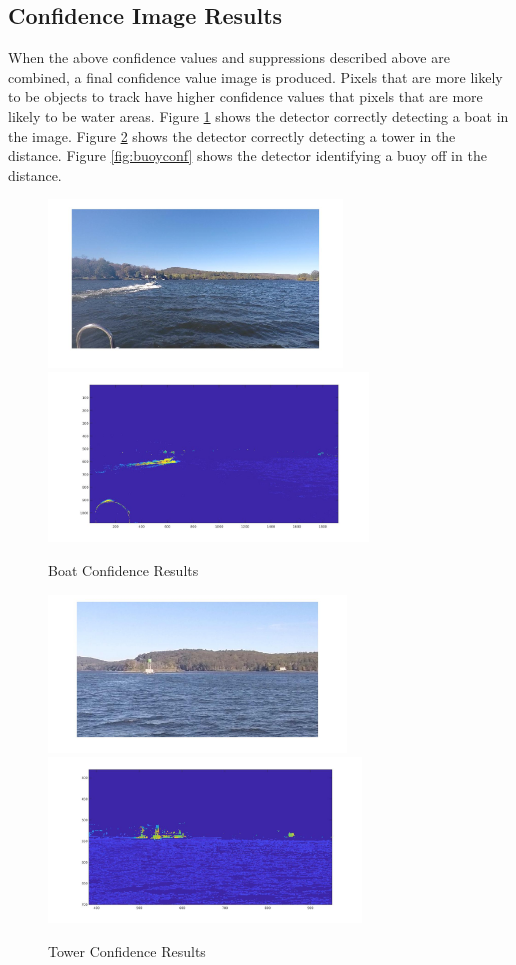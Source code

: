 \documentclass{article}
\begin{document}
\subsection{Confidence Image Results}
When the above confidence values and suppressions described above are combined,
a final confidence value image is produced. Pixels that are more likely to be
objects to track have higher confidence values that pixels that are more likely
to be water areas. Figure \ref{fig:boatconf} shows the detector correctly
detecting a boat in the image.  Figure \ref{fig:towerconf} shows the detector
correctly detecting a tower in the distance.  Figure \ref{fig:buoyconf} shows
the detector identifying a buoy off in the distance.

\begin{figure}[H]
\label{fig:boatconf}
\includegraphics[width=7.8cm]{hsv_kmeans2_orig}
\includegraphics[width=8.5cm]{hsv_kmeans2_suppressed}
\centering
\caption{Boat Confidence Results}
\end{figure}

\begin{figure}[H]
\label{fig:towerconf}
\includegraphics[width=7.9cm]{hsv_kmeans2_tower}
\includegraphics[width=8.3cm]{hsv_kmeans2_tower_result}
\centering
\caption{Tower Confidence Results}
\end{figure}
\end{document}
